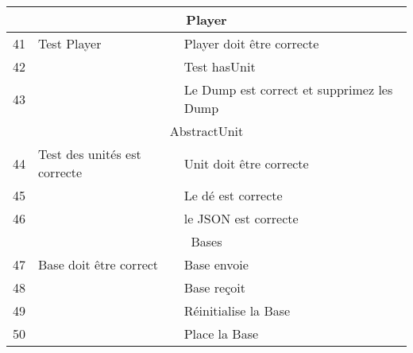 \begin{center}
\begin{tabular}{|l|l|l|}
        \hline
        \multicolumn{3}{c}{Player}                                                                             \\
        \hline
        41 & Test Player                  & Player doit être correcte                                          \\
        42 &                              & Test hasUnit                                                       \\
        43 &                              & Le Dump est correct et supprimez les Dump                          \\


        \hline
        \multicolumn{3}{c}{AbstractUnit}                                                                       \\
        \hline

        44 & Test des unités est correcte & Unit doit être correcte                                            \\
        45 &                              & Le dé est correcte                                                 \\
        46 &                              & le JSON est correcte                                               \\

        \hline
        \multicolumn{3}{c}{Bases}                                                                              \\
        \hline

        47 & Base doit être correct       & Base envoie                                                        \\
        48 &                              & Base reçoit                                                        \\
        49 &                              & Réinitialise la Base                                               \\
        50 &                              & Place la Base                                                      \\


\end{tabular}
\end{center}
